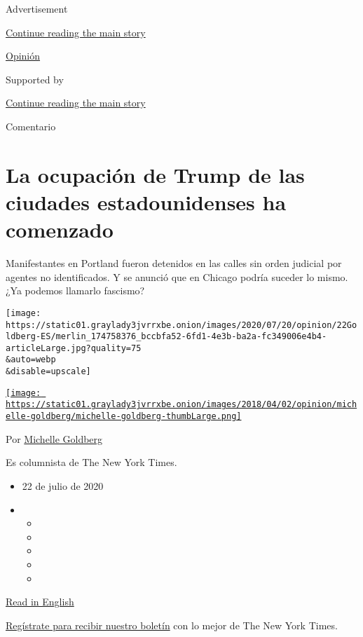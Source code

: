 Advertisement

\protect\hyperlink{after-top}{Continue reading the main story}

\href{/es/section/opinion}{Opinión}

Supported by

\protect\hyperlink{after-sponsor}{Continue reading the main story}

Comentario

\hypertarget{la-ocupaciuxf3n-de-trump-de-las-ciudades-estadounidenses-ha-comenzado}{%
\section{La ocupación de Trump de las ciudades estadounidenses ha
comenzado}\label{la-ocupaciuxf3n-de-trump-de-las-ciudades-estadounidenses-ha-comenzado}}

Manifestantes en Portland fueron detenidos en las calles sin orden
judicial por agentes no identificados. Y se anunció que en Chicago
podría suceder lo mismo. ¿Ya podemos llamarlo fascismo?

\texttt{[image: https://static01.graylady3jvrrxbe.onion/images/2020/07/20/opinion/22Goldberg-ES/merlin\_174758376\_bccbfa52-6fd1-4e3b-ba2a-fc349006e4b4-articleLarge.jpg?quality=75\\\&auto=webp\\\&disable=upscale]}

\href{https://www.nytimes3xbfgragh.onion/by/michelle-goldberg}{\texttt{[image: https://static01.graylady3jvrrxbe.onion/images/2018/04/02/opinion/michelle-goldberg/michelle-goldberg-thumbLarge.png]}}

Por
\href{https://www.nytimes3xbfgragh.onion/by/michelle-goldberg}{Michelle
Goldberg}

Es columnista de The New York Times.

\begin{itemize}
\item
  22 de julio de 2020
\item
  \begin{itemize}
  \item
  \item
  \item
  \item
  \item
  \end{itemize}
\end{itemize}

\href{https://www.nytimes3xbfgragh.onion/2020/07/20/opinion/portland-protests-trump.html}{Read
in English}

\href{https://www.nytimes3xbfgragh.onion/newsletters/el-times}{Regístrate
para recibir nuestro boletín} con lo mejor de The New York Times.

